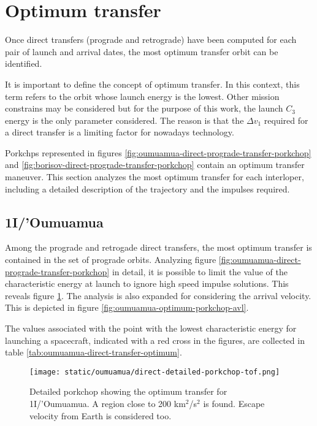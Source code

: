 \section{Optimum transfer}
\label{sec:optimum-transfer}

Once direct transfers (prograde and retrograde) have been computed for each pair
of launch and arrival dates, the most optimum transfer orbit can be identified.

It is important to define the concept of optimum transfer. In this context, this
term refers to the orbit whose launch energy is the lowest. Other mission
constrains may be considered but for the purpose of this work, the launch $C_3$
energy is the only parameter considered. The reason is that the $\Delta v_1$
required for a direct transfer is a limiting factor for nowadays technology.

Porkchps represented in figures
\ref{fig:oumuamua-direct-prograde-transfer-porkchop} and
\ref{fig:borisov-direct-prograde-transfer-porkchop} contain an optimum transfer
maneuver. This section analyzes the most optimum transfer for each interloper,
including a detailed description of the trajectory and the impulses required.

\subsection{1I/'Oumuamua}

Among the prograde and retrogade direct transfers, the most optimum transfer is
contained in the set of prograde orbits. Analyzing figure
\ref{fig:oumuamua-direct-prograde-transfer-porkchop} in detail, it is possible
to limit the value of the characteristic energy at launch to ignore high speed
impulse solutions. This reveals figure \ref{fig:oumuamua-optimum-porkchop}. The
analysis is also expanded for considering the arrival velocity. This is depicted
in figure \ref{fig:oumuamua-optimum-porkchop-avl}.

The values associated with the point with the lowest characteristic energy for
launching a spacecraft, indicated with a red cross in the figures, are collected
in table \ref{tab:oumuamua-direct-transfer-optimum}.

\begin{figure}[H]
  \centering
  \texttt{[image: static/oumuamua/direct-detailed-porkchop-tof.png]}
  \caption[Detailed porkchop showing the optimum transfer for
    1I/'Oumuamua with the time of flight.]{Detailed porkchop showing the optimum transfer for
    1I/'Oumuamua. A region close to 200 km$^2$/s$^2$ is found. Escape
    velocity from Earth is considered too.
  }
  \label{fig:oumuamua-optimum-porkchop}
\end{figure}

